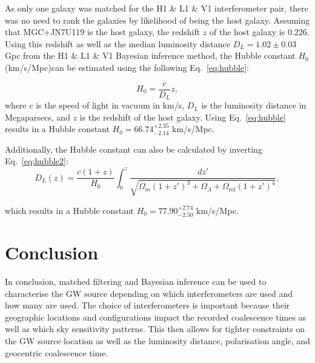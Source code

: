 \documentclass[11pt,a4paper]{article}
\begin{document}
As only one galaxy was matched for the H1 \& L1 \& V1 interferometer pair, there was no need to rank the galaxies by likelihood of being the host galaxy. Assuming that MGC+JN7U119 is the host galaxy, the redshift $z$ of the host galaxy is 0.226. Using this redshift as well as the median luminosity distance $D_L = 1.02 \pm 0.03$ Gpc from the H1 \& L1 \& V1 Bayesian inference method, the Hubble constant $H_0$ (km/s/Mpc)can be estimated using the following Eq.~\ref{eq:hubble}:

\begin{equation}
    H_0 = \frac{c}{D_L}{z},
    \label{eq:hubble}
\end{equation}
where $c$ is the speed of light in vacuum in km/s, $D_L$ is the luminosity distance in Megaparsecs, and $z$ is the redshift of the host galaxy. Using Eq.~\ref{eq:hubble} results in a Hubble constant $H_0=66.74^{+2.35}_{-2.14}$ km/s/Mpc. 

Additionally, the Hubble constant can also be calculated by inverting Eq.~\ref{eq:hubble2}:
\begin{equation}
    D_L(z) = \frac{c(1 + z)}{H_0} \int_0^z \frac{dz'}{\sqrt{\Omega_m (1 + z')^3 + \Omega_\Lambda + \Omega_\mathrm{rel}(1+z')^4}},
    \label{eq:hubble2}
\end{equation}

which results in a Hubble constant $H_0=77.90^{+2.74}_{-2.50}$ km/s/Mpc.

\clearpage
\section{Conclusion}
\label{sec:conclusion}
In conclusion, matched filtering and Bayesian inference can be used to characterise the GW source depending on which interferometers are used and how many are used. The choice of interferometers is important because their geographic locations and configurations impact the recorded coalescence times as well as which sky sensitivity patterns. This then allows for tighter constraints on the GW source location as well as the luminosity distance, polarisation angle, and geocentric coalescence time. 
\end{document}
